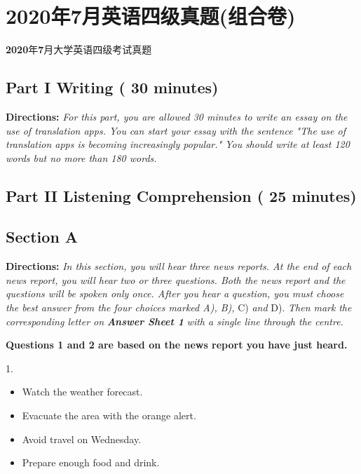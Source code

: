 \documentclass[UTF8,11pt]{ctexart}
\begin{document}
\section*{2020年7月英语四级真题(组合卷)}
\textbf{2020}年\textbf{7}月大学英语四级考试真题


\subsection*{\textbf{Part }I \textbf{Writing} \textbf{( 30 minutes)}}


\textbf{Directions: }\textit{For this part, you are allowed 30 minutes to write an essay on the use of translation apps. You} \textit{can start your essay with the sentence "The use of translation apps is becoming increasingly popular." You} \textit{should write at least 120 words but no more than 180 words.}


\subsection*{\textbf{Part }II \textbf{Listening Comprehension} \textbf{( 25 minutes)}}


\subsection*{\textbf{Section A}}


\textbf{Directions: }\textit{In this section, you will hear three news reports. At the end of each news report, you will hear} \textit{two or three questions. Both the news report and the questions will be spoken only once. After you hear a} \textit{question, you must choose the best answer from the four choices marked A), B), }C) \textit{and }D). \textit{Then mark} \textit{the corresponding letter on }\textbf{\textit{Answer Sheet 1 }}\textit{with a single line through the centre.}


\textbf{Questions 1 and 2 are based on the news report you have just heard.}


1.


\begin{itemize}[leftmargin=2em,itemsep=.2em,topsep=.4em]\item[A.] Watch the weather forecast.
\item[B.] Evacuate the area with the orange alert.
\item[C.] Avoid travel on Wednesday.
\item[D.] Prepare enough food and drink.
\end{itemize}
\end{document}

